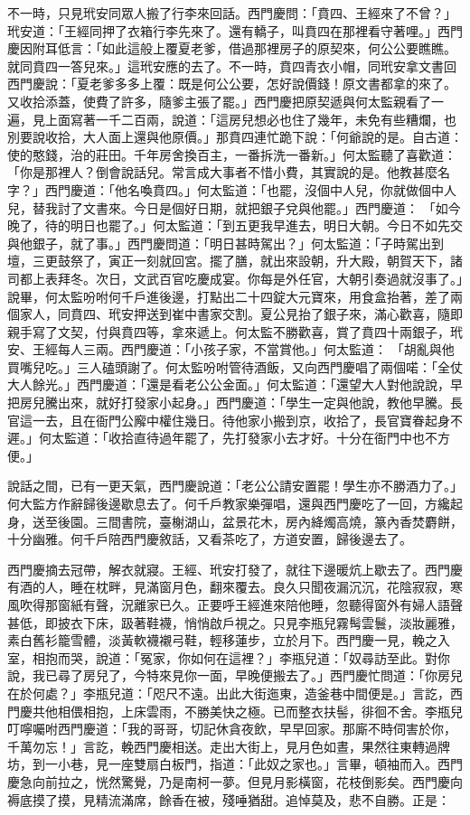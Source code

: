 不一時，只見玳安同眾人搬了行李來回話。西門慶問：「賁四、王經來了不曾？」玳安道：「王經同押了衣箱行李先來了。還有轎子，叫賁四在那裡看守著哩。」西門慶因附耳低言：「如此這般上覆夏老爹，借過那裡房子的原契來，何公公要瞧瞧。就同賁四一答兒來。」這玳安應的去了。不一時，賁四青衣小帽，同玳安拿文書回西門慶說：「夏老爹多多上覆：既是何公公要，怎好說價錢！原文書都拿的來了。又收拾添蓋，使費了許多，隨爹主張了罷。」西門慶把原契遞與何太監親看了一遍，見上面寫著一千二百兩，說道：「這房兒想必也住了幾年，未免有些糟爛，也別要說收拾，大人面上還與他原價。」那賁四連忙跪下說：「何爺說的是。自古道：使的憨錢，治的莊田。千年房舍換百主，一番拆洗一番新。」何太監聽了喜歡道：「你是那裡人？倒會說話兒。常言成大事者不惜小費，其實說的是。他教甚麼名字？」西門慶道：「他名喚賁四。」何太監道：「也罷，沒個中人兒，你就做個中人兒，替我討了文書來。今日是個好日期，就把銀子兌與他罷。」西門慶道： 「如今晚了，待的明日也罷了。」何太監道：「到五更我早進去，明日大朝。今日不如先交與他銀子，就了事。」西門慶問道：「明日甚時駕出？」何太監道：「子時駕出到壇，三更鼓祭了，寅正一刻就回宮。擺了膳，就出來設朝，升大殿，朝賀天下，諸司都上表拜冬。次日，文武百官吃慶成宴。你每是外任官，大朝引奏過就沒事了。」說畢，何太監吩咐何千戶進後邊，打點出二十四錠大元寶來，用食盒抬著，差了兩個家人，同賁四、玳安押送到崔中書家交割。夏公見抬了銀子來，滿心歡喜，隨即親手寫了文契，付與賁四等，拿來遞上。何太監不勝歡喜，賞了賁四十兩銀子，玳安、王經每人三兩。西門慶道：「小孩子家，不當賞他。」何太監道： 「胡亂與他買嘴兒吃。」三人磕頭謝了。何太監吩咐管待酒飯，又向西門慶唱了兩個喏：「全仗大人餘光。」西門慶道：「還是看老公公金面。」何太監道：「還望大人對他說說，早把房兒騰出來，就好打發家小起身。」西門慶道：「學生一定與他說，教他早騰。長官這一去，且在衙門公廨中權住幾日。待他家小搬到京，收拾了，長官寶眷起身不遲。」何太監道：「收拾直待過年罷了，先打發家小去才好。十分在衙門中也不方便。」

說話之間，已有一更天氣，西門慶說道：「老公公請安置罷！學生亦不勝酒力了。」何大監方作辭歸後邊歇息去了。何千戶教家樂彈唱，還與西門慶吃了一回，方纔起身，送至後園。三間書院，臺榭湖山，盆景花木，房內絳燭高燒，篆內香焚麝餅，十分幽雅。何千戶陪西門慶敘話，又看茶吃了，方道安置，歸後邊去了。

西門慶摘去冠帶，解衣就寢。王經、玳安打發了，就往下邊暖炕上歇去了。西門慶有酒的人，睡在枕畔，見滿窗月色，翻來覆去。良久只聞夜漏沉沉，花陰寂寂，寒風吹得那窗紙有聲，況離家已久。正要呼王經進來陪他睡，忽聽得窗外有婦人語聲甚低，即披衣下床，趿著鞋襪，悄悄啟戶視之。只見李瓶兒霧髩雲鬟，淡妝麗雅，素白舊衫籠雪體，淡黃軟襪襯弓鞋，輕移蓮步，立於月下。西門慶一見，輓之入室，相抱而哭，說道：「冤家，你如何在這裡？」李瓶兒道：「奴尋訪至此。對你說，我已尋了房兒了，今特來見你一面，早晚便搬去了。」西門慶忙問道：「你房兒在於何處？」李瓶兒道：「咫尺不遠。出此大街迤東，造釜巷中間便是。」言訖，西門慶共他相偎相抱，上床雲雨，不勝美快之極。已而整衣扶髻，徘徊不舍。李瓶兒叮嚀囑咐西門慶道：「我的哥哥，切記休貪夜飲，早早回家。那廝不時伺害於你，千萬勿忘！」言訖，輓西門慶相送。走出大街上，見月色如晝，果然往東轉過牌坊，到一小巷，見一座雙扇白板門，指道：「此奴之家也。」言畢，頓袖而入。西門慶急向前拉之，恍然驚覺，乃是南柯一夢。但見月影橫窗，花枝倒影矣。西門慶向褥底摸了摸，見精流滿席，餘香在被，殘唾猶甜。追悼莫及，悲不自勝。正是：

